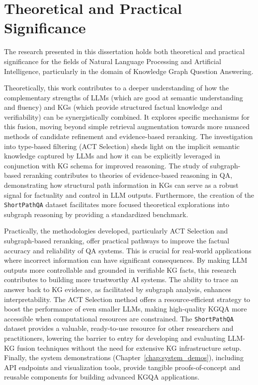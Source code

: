 \section{Theoretical and Practical Significance}
\label{sec:intro:significance}
The research presented in this dissertation holds both theoretical and practical significance for the fields of Natural Language Processing and Artificial Intelligence, particularly in the domain of Knowledge Graph Question Answering.

Theoretically, this work contributes to a deeper understanding of how the complementary strengths of LLMs (which are good at semantic understanding and fluency) and KGs (which provide structured factual knowledge and verifiability) can be synergistically combined. It explores specific mechanisms for this fusion, moving beyond simple retrieval augmentation towards more nuanced methods of candidate refinement and evidence-based reranking. The investigation into type-based filtering (ACT Selection) sheds light on the implicit semantic knowledge captured by LLMs and how it can be explicitly leveraged in conjunction with KG schema for improved reasoning. The study of subgraph-based reranking contributes to theories of evidence-based reasoning in QA, demonstrating how structural path information in KGs can serve as a robust signal for factuality and control in LLM outputs. Furthermore, the creation of the \texttt{ShortPathQA} dataset facilitates more focused theoretical explorations into subgraph reasoning by providing a standardized benchmark.

Practically, the methodologies developed, particularly ACT Selection and subgraph-based reranking, offer practical pathways to improve the factual accuracy and reliability of QA systems. This is crucial for real-world applications where incorrect information can have significant consequences. By making LLM outputs more controllable and grounded in verifiable KG facts, this research contributes to building more trustworthy AI systems. The ability to trace an answer back to KG evidence, as facilitated by subgraph analysis, enhances interpretability. The ACT Selection method offers a resource-efficient strategy to boost the performance of even smaller LLMs, making high-quality KGQA more accessible when computational resources are constrained. The \texttt{ShortPathQA} dataset provides a valuable, ready-to-use resource for other researchers and practitioners, lowering the barrier to entry for developing and evaluating LLM-KG fusion techniques without the need for extensive KG infrastructure setup. Finally, the system demonstrations (Chapter~\ref{chap:system_demos}), including API endpoints and visualization tools, provide tangible proofs-of-concept and reusable components for building advanced KGQA applications.

